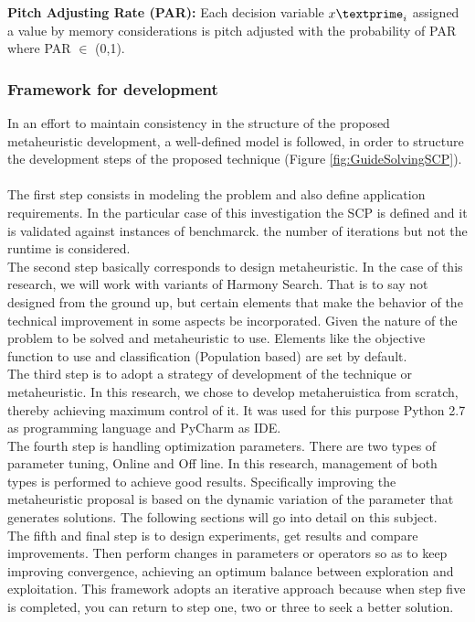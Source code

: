 \textbf{Pitch Adjusting Rate (PAR):} 
Each decision variable ${x\textprime}_i$ assigned a value by memory considerations is pitch adjusted with the probability of PAR where PAR $\in$ (0,1).

\subsubsection{Framework for development}
In an effort to maintain consistency in the structure of the proposed metaheuristic development, a well-defined model is followed, in order to structure the development steps of the proposed technique (Figure \ref{fig:GuideSolvingSCP}). \\
~\\
The first step consists in modeling the problem and also define application requirements. In the particular case of this investigation the SCP is defined and it is validated against instances of benchmarck. the number of iterations but not the runtime is considered.\\

The second step basically corresponds to design metaheuristic. In the case of this research, we will work with variants of Harmony Search. That is to say not designed from the ground up, but certain elements that make the behavior of the technical improvement in some aspects be incorporated. Given the nature of the problem to be solved and metaheuristic to use. Elements like the objective function to use and classification (Population based) are set by default.\\

The third step is to adopt a strategy of development of the technique or metaheuristic. In this research, we chose to develop metaheruistica from scratch, thereby achieving maximum control of it. It was used for this purpose Python 2.7 as programming language and  PyCharm as IDE.\\

The fourth step is handling optimization parameters. There are two types of parameter tuning, Online and Off line. In this research, management of both types is performed to achieve good results. Specifically improving the metaheuristic proposal is based on the dynamic variation of the parameter that generates solutions. The following sections will go into detail on this subject.\\

The fifth and final step is to design experiments, get results and compare improvements. Then perform changes in parameters or operators so as to keep improving convergence, achieving an optimum balance between exploration and exploitation. This framework adopts an iterative approach because when step five is completed, you can return to step one, two or three to seek a better solution.